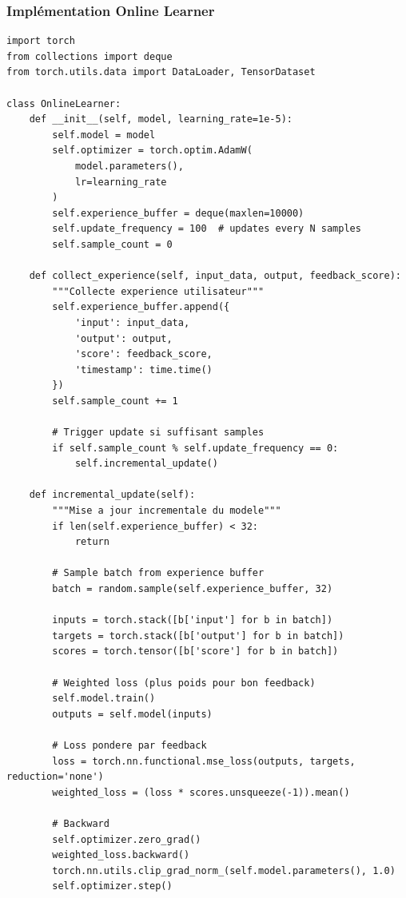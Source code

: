 \documentclass[12pt,a4paper]{article}
\begin{document}
\subsubsection{Implémentation Online Learner}

\begin{lstlisting}[caption={Online Learning System}]
import torch
from collections import deque
from torch.utils.data import DataLoader, TensorDataset

class OnlineLearner:
    def __init__(self, model, learning_rate=1e-5):
        self.model = model
        self.optimizer = torch.optim.AdamW(
            model.parameters(), 
            lr=learning_rate
        )
        self.experience_buffer = deque(maxlen=10000)
        self.update_frequency = 100  # updates every N samples
        self.sample_count = 0
        
    def collect_experience(self, input_data, output, feedback_score):
        """Collecte experience utilisateur"""
        self.experience_buffer.append({
            'input': input_data,
            'output': output,
            'score': feedback_score,
            'timestamp': time.time()
        })
        self.sample_count += 1
        
        # Trigger update si suffisant samples
        if self.sample_count % self.update_frequency == 0:
            self.incremental_update()
            
    def incremental_update(self):
        """Mise a jour incrementale du modele"""
        if len(self.experience_buffer) < 32:
            return
            
        # Sample batch from experience buffer
        batch = random.sample(self.experience_buffer, 32)
        
        inputs = torch.stack([b['input'] for b in batch])
        targets = torch.stack([b['output'] for b in batch])
        scores = torch.tensor([b['score'] for b in batch])
        
        # Weighted loss (plus poids pour bon feedback)
        self.model.train()
        outputs = self.model(inputs)
        
        # Loss pondere par feedback
        loss = torch.nn.functional.mse_loss(outputs, targets, reduction='none')
        weighted_loss = (loss * scores.unsqueeze(-1)).mean()
        
        # Backward
        self.optimizer.zero_grad()
        weighted_loss.backward()
        torch.nn.utils.clip_grad_norm_(self.model.parameters(), 1.0)
        self.optimizer.step()
        

\end{lstlisting}
\end{document}

